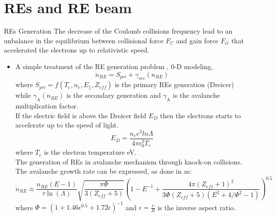 \documentclass{beamer}
\begin{document}
\section{REs and RE beam}

\begin{frame}[allowframebreaks]{REs Generation}
\scriptsize
The decrease of the Coulomb collisions frequency lead to an unbalance in the equilibrium between collisional force $F_C$ and gain force $F_G$ that accelerated the electrons up to relativistic speed.
\begin{itemize}
	\item  A simple treatment of the RE generation problem \cite{paz2014growth}, 0-D modeling,
	\begin{equation}
	\dot{n}_{RE} = S_{pri} + \gamma_{sec}(n_{RE})
	\end{equation}
    where $S_{pri} = f(T_{e},n_e,E_{||},Z_{eff})$ is the primary REs generation (Dreicer) while $\gamma_{\text{A}}(n_{RE})$ is the secondary generation and $\gamma_{\text{A}}$ is the avalanche multiplication factor.\\
    If the electric field is above the Dreicer field $E_D$ then the electrons starts to accelerate up to the speed of light.
    \begin{equation}
    \label{eq:DreicerForce}
     E_D = \frac{n_e e^3 ln \Lambda}{4 \pi \epsilon^2_0 T_e}
    \end{equation} 
    where $T_e$ is the electron temperature \si{\eV}.\\
    The generation of REs in avalanche mechanism through knock-on collisions.
    The avalanche growth rate can be expressed, as done in \cite{PutvinskiRosenbluth} as:
    \begin{equation}
     \label{eq:PutvinskiRosenbluth}
     \dot{n}_{RE} \approx \frac{n_{RE}(E-1)}{\tau \ln (\Lambda)} \sqrt{\frac{\pi \Phi}{3(Z_{eff} + 5)}} \left(1-E^{-1}+\frac{4\pi(Z_{eff}+1)^2}{3\Phi(Z_{eff}+5)(E^2+4/\Phi^2-1)}\right)^{0.5}
    \end{equation}
    where $\Phi = (1+1.46\epsilon^0.5+1.72\epsilon)^{-1}$ and $\epsilon = \frac{r}{R}$ is the inverse aspect ratio.\\


\end{itemize}
\end{frame}
\end{document}

